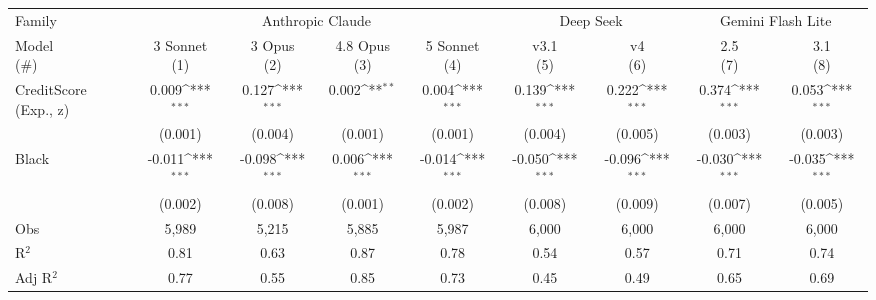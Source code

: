 {
\def\sym#1{\ifmmode^{#1}\else\(^{#1}\)\fi}
\begin{tabular}{l*{8}{c}}
\toprule
Family          &\multicolumn{4}{c}{Anthropic Claude}                                       &\multicolumn{2}{c}{Deep Seek}        &\multicolumn{2}{c}{Gemini Flash Lite}\\\cmidrule(lr){2-5}\cmidrule(lr){6-7}\cmidrule(lr){8-9}
\shortstack{\vphantom{Model Opus}Model\\(\#)}&\shortstack{\vphantom{Model Opus}3 Sonnet\\(1)}         &\shortstack{\vphantom{Model Opus}3 Opus  \\(2)}         &\shortstack{\vphantom{Model Opus}4.8 Opus  \\(3)}         &\shortstack{\vphantom{Model Opus}5 Sonnet\\(4)}         &\shortstack{\vphantom{Model Opus}v3.1  \\(5)}         &\shortstack{\vphantom{Model Opus}v4    \\(6)}         &\shortstack{\vphantom{Model Opus}2.5   \\(7)}         &\shortstack{\vphantom{Model Opus}3.1   \\(8)}         \\
\midrule
CreditScore (Exp., z)&    0.009\sym{***}&    0.127\sym{***}&    0.002\sym{**} &    0.004\sym{***}&    0.139\sym{***}&    0.222\sym{***}&    0.374\sym{***}&    0.053\sym{***}\\
                &  (0.001)         &  (0.004)         &  (0.001)         &  (0.001)         &  (0.004)         &  (0.005)         &  (0.003)         &  (0.003)         \\
Black           &   -0.011\sym{***}&   -0.098\sym{***}&    0.006\sym{***}&   -0.014\sym{***}&   -0.050\sym{***}&   -0.096\sym{***}&   -0.030\sym{***}&   -0.035\sym{***}\\
                &  (0.002)         &  (0.008)         &  (0.001)         &  (0.002)         &  (0.008)         &  (0.009)         &  (0.007)         &  (0.005)         \\
\midrule
Obs             &    5,989         &    5,215         &    5,885         &    5,987         &    6,000         &    6,000         &    6,000         &    6,000         \\
R$^2$           &     0.81         &     0.63         &     0.87         &     0.78         &     0.54         &     0.57         &     0.71         &     0.74         \\
Adj R$^2$       &     0.77         &     0.55         &     0.85         &     0.73         &     0.45         &     0.49         &     0.65         &     0.69         \\

\end{tabular}}
